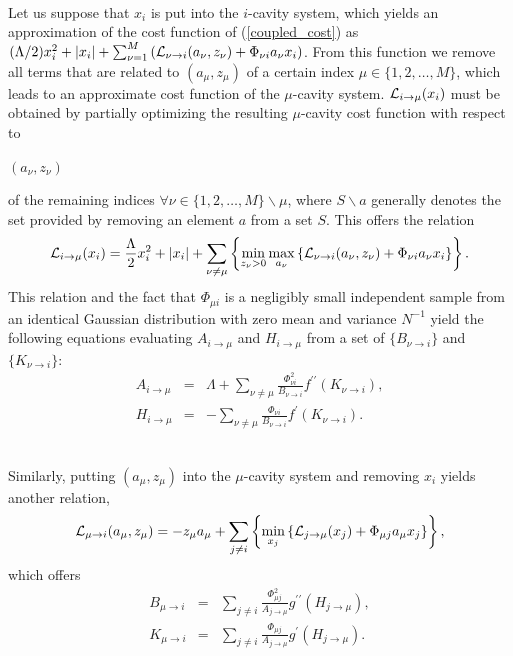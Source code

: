\documentclass[12pt]{iopart}
\begin{document}
 \\
Let us suppose that $x_i$ is put into the $i$-cavity system, which yields an approximation of the cost function of (\ref{coupled_cost}) as $(\Lambda/2)x_i^2 + |x_i| + \sum_{\nu =1}^M \left ({\cal L}_{\nu \to i}(a_\nu, z_\nu)+\Phi_{\nu i} a_\nu x_i \right )$. From this function we remove all terms that are related to $(a_\mu,z_\mu)$ of a certain index $\mu \in \{1,2,\ldots,M\}$, which leads to an approximate cost function of the $\mu$-cavity system. ${\cal L}_{i \to \mu}(x_i)$ must be obtained by partially optimizing the resulting $\mu$-cavity cost function with respect to 

$(a_\nu, z_\nu)$ 

of the remaining indices $\forall{\nu} \in \{1,2,\ldots,M\} \backslash \mu$, where $S \backslash a$ generally denotes the set provided by removing an element $a$ from a set $S$. This offers the relation
\begin{eqnarray}
{\cal L}_{i\to \mu}(x_i) = \frac{\Lambda}{2} x_i^2 + |x_i|+
\sum_{\nu \ne \mu} \left \{ \mathop{\rm min}_{z_\nu >0} \mathop{\rm max}_{a_\nu} 
\left \{{\cal L}_{\nu \to i}(a_\nu, z_\nu)+\Phi_{\nu i} a_\nu x_i \right \} \right \}.  
\label{Vstep}
\end{eqnarray}
This relation and the fact that $\Phi_{\mu i}$ is a negligibly small independent sample from an identical Gaussian distribution with zero mean and variance $N^{-1}$ yield the following equations evaluating $A_{i \to \mu}$ and $H_{i \to \mu}$ from a set of $\{B_{\nu \to i}\}$ and $\{K_{\nu \to i}\}$:
\begin{eqnarray}
A_{i \to \mu}&=&\Lambda+ \sum_{\nu \ne \mu} \frac{\Phi_{\nu i}^2}{B_{\nu \to i}} 
f^{\prime \prime} (K_{\nu \to i}), \label{VstepA} \\
H_{i \to \mu}&=& - \sum_{\nu \ne \mu} \frac{\Phi_{\nu i}}{B_{\nu \to i} }
f^{\prime }(K_{\nu \to i}). \label{VstepH}
\end{eqnarray}

\\
Similarly, putting $(a_\mu, z_\mu)$ into the $\mu$-cavity system and removing $x_i$ yields another relation,
\begin{eqnarray}
{\cal L}_{\mu \to i}(a_\mu, z_\mu)=- z_\mu a_\mu+\sum_{j \ne i} 
\left \{
\mathop{\rm min}_{x_j}\left \{
{\cal L}_{j \to \mu} (x_j)+\Phi_{\mu j} a_\mu x_j \right \} \right \}, 
\label{Hstep}
\end{eqnarray}
which offers 
\begin{eqnarray}
B_{\mu \to i}&=&\sum_{j \ne i} \frac{\Phi_{\mu j}^2}{A_{j \to \mu}} g^{\prime \prime}(H_{j \to \mu}), \label{HstepB} \\
K_{\mu \to i}&=&\sum_{j \ne i} \frac{\Phi_{\mu j}}{A_{j \to \mu}}g^{\prime}(H_{j \to \mu}).  \label{HstepK}
\end{eqnarray}
\\
\end{document}
